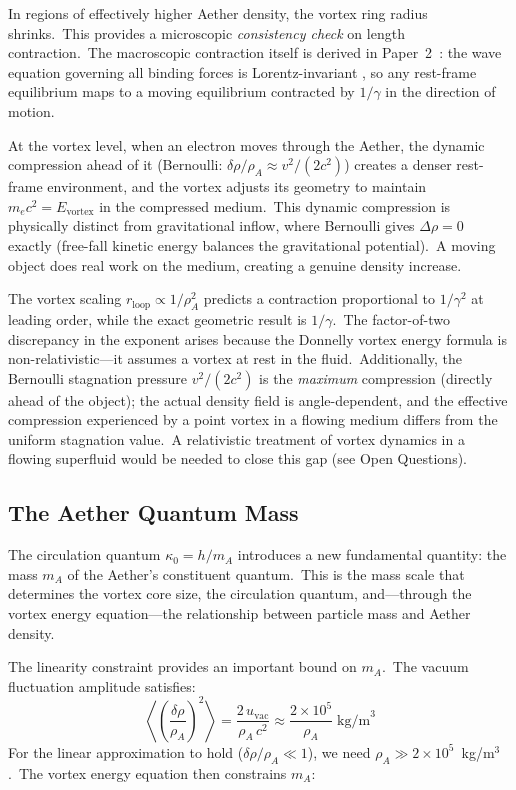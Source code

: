 ﻿\documentclass[12pt,letterpaper]{article}
\newcommand{\rhoa}{\rho_{\!A}}
\begin{document}
In regions of effectively higher Aether density, the vortex ring radius shrinks.\
This provides a microscopic \emph{consistency check} on length contraction.\
The macroscopic contraction itself is derived in
Paper~2~\cite{otto-relativity}: the wave equation governing all binding
forces is Lorentz-invariant \cite{lorentz1904}, so any rest-frame
equilibrium maps to a moving equilibrium contracted by $1/\gamma$ in the
direction of motion.

At the vortex level, when an electron moves through the Aether, the dynamic
compression ahead of it (Bernoulli: $\delta\rho/\rhoa \approx v^2/(2c^2)$)
creates a denser rest-frame environment, and the vortex adjusts its geometry to
maintain $m_e c^2 = E_{\mathrm{vortex}}$ in the compressed medium.\ This
dynamic compression is physically distinct from gravitational inflow, where
Bernoulli gives $\Delta\rho = 0$ exactly (free-fall kinetic energy balances the
gravitational potential).\ A moving object does real work on the medium,
creating a genuine density increase.

The vortex scaling $r_{\mathrm{loop}} \propto 1/\rhoa^2$ predicts a contraction
proportional to $1/\gamma^2$ at leading order, while the exact geometric
result is $1/\gamma$.\ The factor-of-two discrepancy in the exponent arises
because the Donnelly vortex energy formula is non-relativistic---it assumes a
vortex at rest in the fluid.\ Additionally, the Bernoulli stagnation pressure
$v^2/(2c^2)$ is the \emph{maximum} compression (directly ahead of the object);
the actual density field is angle-dependent, and the effective compression
experienced by a point vortex in a flowing medium differs from the uniform
stagnation value.\ A relativistic treatment of vortex dynamics in a flowing
superfluid would be needed to close this gap (see Open Questions).


\subsection{The Aether Quantum Mass}

The circulation quantum $\kappa_0 = h/m_A$ introduces a new fundamental
quantity: the mass $m_A$ of the Aether's constituent quantum.\ This is the mass
scale that determines the vortex core size, the circulation quantum, and---through
the vortex energy equation---the relationship between particle mass and Aether
density.

The linearity constraint provides an important bound on $m_A$.\ The vacuum
fluctuation amplitude satisfies:
%
\begin{equation}
  \left\langle\left(\frac{\delta\rho}{\rhoa}\right)^{\!2}\right\rangle
  = \frac{2\,u_{\mathrm{vac}}}{\rhoa\,c^2}
  \approx \frac{2 \times 10^5}{\rhoa}\;\text{kg/m}^3
\end{equation}
%
For the linear approximation to hold ($\delta\rho/\rhoa \ll 1$), we need
$\rhoa \gg 2 \times 10^5$~kg/m$^3$.\ The vortex energy equation then constrains
$m_A$:
\end{document}
